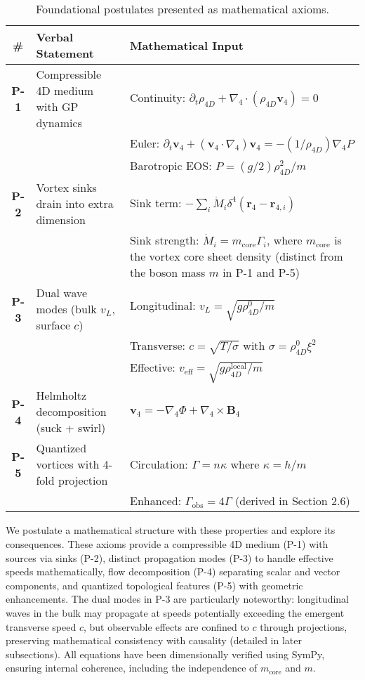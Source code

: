 \begin{table}[H]
\centering
\begin{tabularx}{\textwidth}{|c|Y|Y|}
\hline
\# & Verbal Statement & Mathematical Input \\
\hline
\textbf{P-1} & Compressible 4D medium with GP dynamics & Continuity: $\partial_t \rho_{4D} + \nabla_4 \cdot (\rho_{4D} \mathbf{v}_4) = 0$ \\
& & Euler: $\partial_t \mathbf{v}_4 + (\mathbf{v}_4 \cdot \nabla_4) \mathbf{v}_4 = -(1/\rho_{4D}) \nabla_4 P$ \\
& & Barotropic EOS: $P = (g/2) \rho_{4D}^2 / m$ \\
\hline
\textbf{P-2} & Vortex sinks drain into extra dimension & Sink term: $-\sum_i \dot{M}_i \delta^4(\mathbf{r}_4 - \mathbf{r}_{4,i})$ \\
& & Sink strength: $\dot{M}_i = m_{\text{core}} \Gamma_i$, where $m_{\text{core}}$ is the vortex core sheet density (distinct from the boson mass $m$ in P-1 and P-5) \\
\hline
\textbf{P-3} & Dual wave modes (bulk $v_L$, surface $c$) & Longitudinal: $v_L = \sqrt{g \rho_{4D}^0 / m}$ \\
& & Transverse: $c = \sqrt{T / \sigma}$ with $\sigma = \rho_{4D}^0 \xi^2$ \\
& & Effective: $v_{\text{eff}} = \sqrt{g \rho_{4D}^{\text{local}} / m}$ \\
\hline
\textbf{P-4} & Helmholtz decomposition (suck + swirl) & $\mathbf{v}_4 = -\nabla_4 \Phi + \nabla_4 \times \mathbf{B}_4$ \\
\hline
\textbf{P-5} & Quantized vortices with 4-fold projection & Circulation: $\Gamma = n \kappa$ where $\kappa = h / m$ \\
& & Enhanced: $\Gamma_{\text{obs}} = 4 \Gamma$ (derived in Section 2.6) \\
\hline
\end{tabularx}
\caption{Foundational postulates presented as mathematical axioms.}
\label{tab:postulates}
\end{table}

We postulate a mathematical structure with these properties and explore its consequences. These axioms provide a compressible 4D medium (P-1) with sources via sinks (P-2), distinct propagation modes (P-3) to handle effective speeds mathematically, flow decomposition (P-4) separating scalar and vector components, and quantized topological features (P-5) with geometric enhancements. The dual modes in P-3 are particularly noteworthy: longitudinal waves in the bulk may propagate at speeds potentially exceeding the emergent transverse speed $c$, but observable effects are confined to $c$ through projections, preserving mathematical consistency with causality (detailed in later subsections). All equations have been dimensionally verified using SymPy, ensuring internal coherence, including the independence of $m_{\text{core}}$ and $m$.

